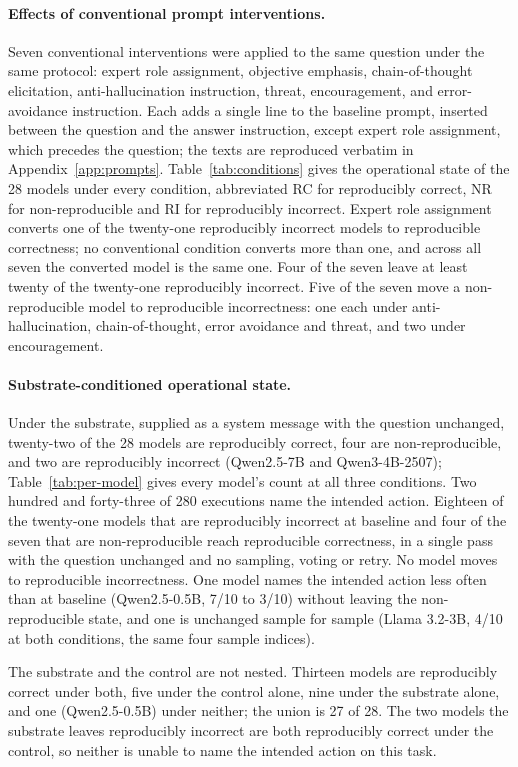 \paragraph{Effects of conventional prompt interventions.}
Seven conventional interventions were applied to the same question under the same
protocol: expert role assignment, objective emphasis, chain-of-thought elicitation,
anti-hallucination instruction, threat, encouragement, and error-avoidance
instruction. Each adds a single line to the baseline prompt, inserted between the
question and the answer instruction, except expert role assignment, which precedes
the question; the texts are reproduced verbatim in Appendix~\ref{app:prompts}.
Table~\ref{tab:conditions} gives the operational state of the 28 models under every
condition, abbreviated RC for reproducibly correct, NR for non-reproducible and RI
for reproducibly incorrect. Expert role assignment converts one of the
twenty-one reproducibly incorrect models to reproducible correctness; no conventional
condition converts more than one, and across all seven the converted model is the
same one. Four of the seven leave at least twenty of the twenty-one reproducibly
incorrect. Five of the seven move a non-reproducible model to reproducible
incorrectness: one each under anti-hallucination, chain-of-thought, error avoidance
and threat, and two under encouragement.

\paragraph{Substrate-conditioned operational state.}
Under the substrate, supplied as a system message with the question unchanged,
twenty-two of the 28 models are reproducibly correct, four are non-reproducible, and
two are reproducibly incorrect (Qwen2.5-7B and Qwen3-4B-2507);
Table~\ref{tab:per-model} gives every model's count at all three conditions. Two
hundred and forty-three of 280 executions name the intended action. Eighteen of the
twenty-one models that are reproducibly incorrect at baseline and four of the seven
that are non-reproducible reach reproducible correctness, in a single pass with the
question unchanged and no sampling, voting or retry. No model moves to reproducible
incorrectness. One model names the intended action less often than at baseline
(Qwen2.5-0.5B, 7/10 to 3/10) without leaving the non-reproducible state, and one is
unchanged sample for sample (Llama 3.2-3B, 4/10 at both conditions, the same four
sample indices).

The substrate and the control are not nested. Thirteen models are reproducibly correct
under both, five under the control alone, nine under the substrate alone, and one
(Qwen2.5-0.5B) under neither; the union is 27 of 28. The two models the substrate
leaves reproducibly incorrect are both reproducibly correct under the control, so
neither is unable to name the intended action on this task.

